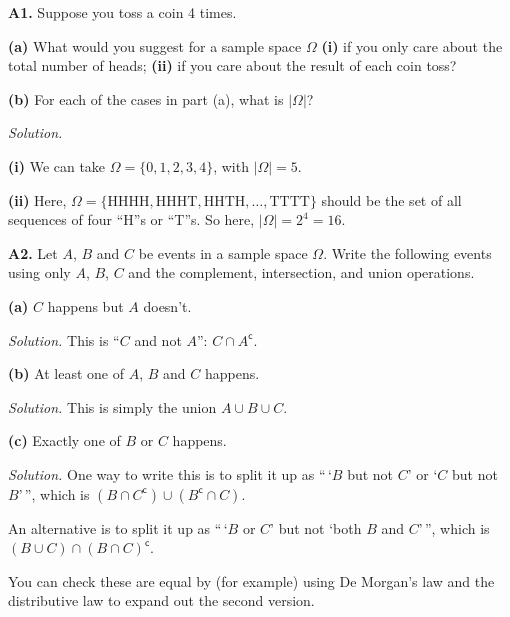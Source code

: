 \documentclass[
  a4paper,
]{book}
\theoremstyle{definition}
\theoremstyle{definition}
\theoremstyle{definition}
\theoremstyle{definition}
\theoremstyle{remark}
\begin{document}
\textbf{A1.} Suppose you toss a coin 4 times.

\textbf{(a)} What would you suggest for a sample space \(\Omega\) \textbf{(i)} if you only care about the total number of heads; \textbf{(ii)} if you care about the result of each coin toss?

\textbf{(b)} For each of the cases in part (a), what is \(|\Omega|\)?

\begin{myanswers}
\emph{Solution.}

\textbf{(i)} We can take \(\Omega = \{0,1,2,3,4\}\), with \(|\Omega| = 5\).

\textbf{(ii)} Here, \(\Omega = \{ \text{HHHH}, \text{HHHT}, \text{HHTH},\dots, \text{TTTT} \}\) should be the set of all sequences of four ``H''s or ``T''s. So here, \(|\Omega| = 2^4 = 16\).

\end{myanswers}

\textbf{A2.} Let \(A\), \(B\) and \(C\) be events in a sample space \(\Omega\). Write the following events using only \(A\), \(B\), \(C\) and the complement, intersection, and union operations.

\textbf{(a)} \(C\) happens but \(A\) doesn't.

\begin{myanswers}
\emph{Solution.} This is ``\(C\) and not \(A\)'': \(C\cap A^{\mathsf{c}}\).

\end{myanswers}

\textbf{(b)} At least one of \(A\), \(B\) and \(C\) happens.

\begin{myanswers}
\emph{Solution.} This is simply the union \(A \cup B\cup C\).

\end{myanswers}

\textbf{(c)} Exactly one of \(B\) or \(C\) happens.

\begin{myanswers}
\emph{Solution.} One way to write this is to split it up as ``\,`\(B\) but not \(C\)' or `\(C\) but not \(B\)'\,'', which is \((B \cap C^{\mathsf{c}}) \cup (B^{\mathsf{c}} \cap C)\).

An alternative is to split it up as ``\,`\(B\) or \(C\)' but not `both \(B\) and \(C\)'\,'', which is \((B \cup C) \cap (B\cap C)^{\mathsf{c}}\).

You can check these are equal by (for example) using De Morgan's law and the distributive law to expand out the second version.

\end{myanswers}
\end{document}
